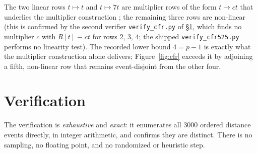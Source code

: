 \documentclass[11pt]{amsart}
\theoremstyle{plain}
\theoremstyle{definition}
\theoremstyle{remark}
\begin{document}
The two linear rows $t\mapsto t$ and $t\mapsto 7t$ are multiplier rows of the
form $t\mapsto ct$ that underlies the multiplier construction
\cite[62.22(1)]{HCD}; the remaining three rows are non-linear (this is
confirmed by the second verifier \texttt{verify\_cfr.py} of
\S\ref{sec:verif}, which finds no multiplier $c$ with $R[t]\equiv ct$ for
rows $2$, $3$, $4$; the shipped \texttt{verify\_cfr525.py} performs no
linearity test). The recorded
lower bound $4=p-1$ is exactly what the multiplier construction alone
delivers; Figure~\ref{fig:cfr} exceeds it by adjoining a fifth, non-linear
row that remains event-disjoint from the other four.

\section{Verification}\label{sec:verif}

The verification is \emph{exhaustive} and \emph{exact}: it enumerates all
$3000$ ordered distance events directly, in integer arithmetic, and confirms
they are distinct. There is no sampling, no floating point, and no randomized
or heuristic step.
\end{document}
